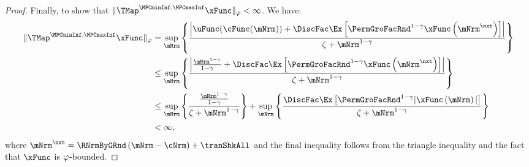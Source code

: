 \documentclass[\econtexRoot/BufferStockTheory]{subfiles}
\begin{document}
\begin{proof}
Finally, to show that $\Vert \TMap^{\MPCminInf, \MPCmaxInf}{\mathfrak{\xFunc}}\Vert_{\boundFunc}<\infty$.
We have:
%
%
\begin{equation}\begin{gathered}\begin{aligned}
\Vert \TMap^{\MPCminInf, \MPCmaxInf}{\mathfrak{\xFunc}}\Vert_{\boundFunc} & = \sup_{\mNrm} \left\{\frac{\left| \uFunc(\cFunc(\mNrm)) + \DiscFac \Ex\left[ {\PermGroFacRnd}^{1-\CRRA }{\mathfrak{\xFunc}} \left( {\mNrm^{\nxt}}\right) \right] \right|}{\zeta + \mNrm^{1-\CRRA}}\right\} \\
& \leq  \sup_{\mNrm} \left\{\frac{\left| \frac{\mNrm^{1-\CRRA}}{1-\CRRA} + \DiscFac \Ex\left[ {\PermGroFacRnd}^{1-\CRRA }{\mathfrak{\xFunc}} \left( {\mNrm^{\nxt}}\right) \right] \right|}{\zeta + \mNrm^{1-\CRRA}}\right\} \\ 
& \leq \sup_{\mNrm} \left\{\frac{\frac{\mNrm^{1-\CRRA}}{1-\CRRA}}{\zeta + \mNrm^{1-\CRRA}}\right\} + \sup_{\mNrm} \left\{\frac{\DiscFac \Ex\left[ {\PermGroFacRnd}^{1-\CRRA }{\vert \mathfrak{\xFunc}} \left( {\mNrm}\right)\vert  \right]}{\zeta + \mNrm^{1-\CRRA}}\right\}\\
& <\infty, 
\end{aligned}\end{gathered}\end{equation}
%
where ${\mNrm}^{\nxt} = \RNrmByGRnd\left(\mNrm - \cNrm\right) + \tranShkAll$ and the final inequality follows from the triangle inequality and the fact that $\xFunc$ is $\varphi$-bounded.

                                           
\end{proof}
\end{document}
